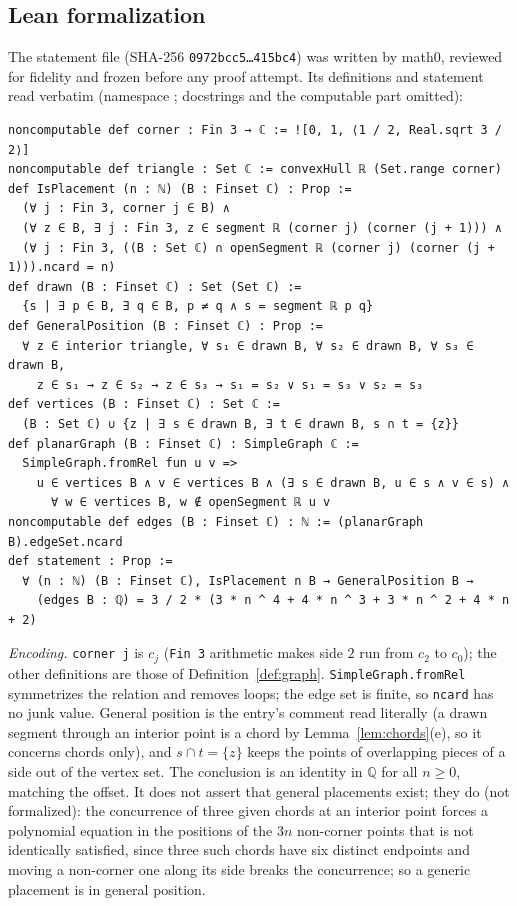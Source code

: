 \documentclass[11pt]{amsart}
\theoremstyle{plain}
\theoremstyle{definition}
\begin{document}
\subsection*{Lean formalization}
The statement file  (SHA-256 \texttt{0972bcc5\ldots 415bc4}) was written by math0, reviewed for fidelity and frozen before any proof attempt. Its definitions and statement read verbatim (namespace ; docstrings and the computable part omitted):
\begin{lstlisting}[basicstyle=\ttfamily\scriptsize]
noncomputable def corner : Fin 3 → ℂ := ![0, 1, ⟨1 / 2, Real.sqrt 3 / 2⟩]
noncomputable def triangle : Set ℂ := convexHull ℝ (Set.range corner)
def IsPlacement (n : ℕ) (B : Finset ℂ) : Prop :=
  (∀ j : Fin 3, corner j ∈ B) ∧
  (∀ z ∈ B, ∃ j : Fin 3, z ∈ segment ℝ (corner j) (corner (j + 1))) ∧
  (∀ j : Fin 3, ((B : Set ℂ) ∩ openSegment ℝ (corner j) (corner (j + 1))).ncard = n)
def drawn (B : Finset ℂ) : Set (Set ℂ) :=
  {s | ∃ p ∈ B, ∃ q ∈ B, p ≠ q ∧ s = segment ℝ p q}
def GeneralPosition (B : Finset ℂ) : Prop :=
  ∀ z ∈ interior triangle, ∀ s₁ ∈ drawn B, ∀ s₂ ∈ drawn B, ∀ s₃ ∈ drawn B,
    z ∈ s₁ → z ∈ s₂ → z ∈ s₃ → s₁ = s₂ ∨ s₁ = s₃ ∨ s₂ = s₃
def vertices (B : Finset ℂ) : Set ℂ :=
  (B : Set ℂ) ∪ {z | ∃ s ∈ drawn B, ∃ t ∈ drawn B, s ∩ t = {z}}
def planarGraph (B : Finset ℂ) : SimpleGraph ℂ :=
  SimpleGraph.fromRel fun u v =>
    u ∈ vertices B ∧ v ∈ vertices B ∧ (∃ s ∈ drawn B, u ∈ s ∧ v ∈ s) ∧
      ∀ w ∈ vertices B, w ∉ openSegment ℝ u v
noncomputable def edges (B : Finset ℂ) : ℕ := (planarGraph B).edgeSet.ncard
def statement : Prop :=
  ∀ (n : ℕ) (B : Finset ℂ), IsPlacement n B → GeneralPosition B →
    (edges B : ℚ) = 3 / 2 * (3 * n ^ 4 + 4 * n ^ 3 + 3 * n ^ 2 + 4 * n + 2)
\end{lstlisting}
\emph{Encoding.} \texttt{corner j} is $c_j$ (\texttt{Fin 3} arithmetic makes side $2$ run from $c_2$ to $c_0$); the other definitions are those of Definition~\ref{def:graph}. \texttt{SimpleGraph.fromRel} symmetrizes the relation and removes loops; the edge set is finite, so \texttt{ncard} has no junk value. General position is the entry's comment read literally (a drawn segment through an interior point is a chord by Lemma~\ref{lem:chords}(e), so it concerns chords only), and $s\cap t=\{z\}$ keeps the points of overlapping pieces of a side out of the vertex set. The conclusion is an identity in $\mathbb{Q}$ for all $n\ge0$, matching the offset. It does not assert that general placements exist; they do (not formalized): the concurrence of three given chords at an interior point forces a polynomial equation in the positions of the $3n$ non-corner points that is not identically satisfied, since three such chords have six distinct endpoints and moving a non-corner one along its side breaks the concurrence; so a generic placement is in general position.
\end{document}
